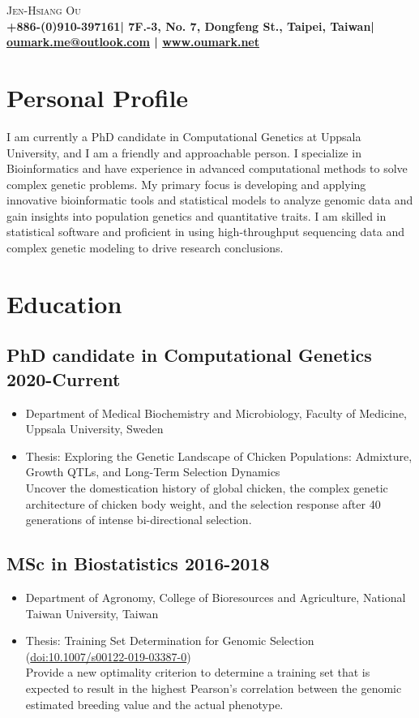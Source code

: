\documentclass[10pt]{article}
\makeatletter
\def\phone{+886-(0)910-397161}
\def\address{7F.-3, No. 7, Dongfeng St., Taipei, Taiwan}
\def\email{oumark.me@outlook.com}
\def\web{www.oumark.net}
\makeatother
\begin{document}
\begin{center}
{\LARGE\scshape Jen-Hsiang Ou}\\[2pt]
{\color{gray}\bf\phone | \address | \href{mailto:\email}{\email} | \href{\web}{\web}}
\end{center}


\section*{Personal Profile}
I am currently a PhD candidate in Computational Genetics at Uppsala University, and I am a friendly and approachable person. I specialize in Bioinformatics and have experience in advanced computational methods to solve complex genetic problems. My primary focus is developing and applying innovative bioinformatic tools and statistical models to analyze genomic data and gain insights into population genetics and quantitative traits. I am skilled in statistical software and proficient in using high-throughput sequencing data and complex genetic modeling to drive research conclusions.


\section*{Education}

\subsection*{PhD candidate in Computational Genetics \hfill 2020-Current}
\begin{itemize}
\item Department of Medical Biochemistry and Microbiology, Faculty of Medicine, Uppsala University, Sweden
\item Thesis: Exploring the Genetic Landscape of Chicken Populations: Admixture, Growth QTLs, and Long-Term Selection Dynamics \\ {\color{gray} Uncover the domestication history of global chicken, the complex genetic architecture of chicken body weight, and the selection response after 40 generations of intense bi-directional selection.}
\end{itemize}


\subsection*{MSc in Biostatistics \hfill 2016-2018}
\begin{itemize}
\item Department of Agronomy, College of Bioresources and Agriculture, National Taiwan University, Taiwan
\item Thesis: Training Set Determination for Genomic Selection (\href{https://doi.org/10.1007/s00122-019-03387-0}{doi:10.1007/s00122-019-03387-0}) \\ {\color{gray} Provide a new optimality criterion to determine a training set that is expected to result in the highest Pearson's correlation between the genomic estimated breeding value and the actual phenotype.}
\end{itemize}
\end{document}
